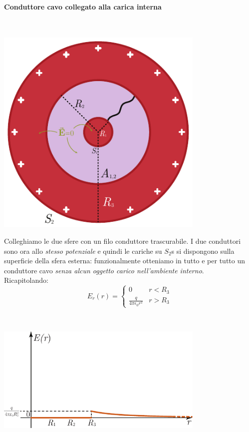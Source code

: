 \paragraph{Conduttore cavo collegato alla carica interna}~\\
\begin{minipage}{0.43\textwidth}
	\begin{center}
		\includegraphics[width=0.75\textwidth]{images/chp4sferacavaconsferacollegata.pdf}
	\end{center}
\end{minipage}\hspace{10pt}
\begin{minipage}{0.56\textwidth}
	Colleghiamo le due sfere con un filo conduttore trascurabile. I due conduttori sono ora allo \textit{stesso potenziale} e quindi le cariche su $S_2$s si dispongono sulla superficie della sfera esterna: funzionalmente otteniamo in tutto e per tutto un conduttore cavo \textit{senza alcun oggetto carico nell'ambiente interno}.\\
	Ricapitolando:
	\begin{equation*}
		E_{r}(r)=\begin{cases}
			0 & r<R_3\\
			\frac{q}{4\pi\epsilon_0 r^2} & r>R_3
		\end{cases}
	\end{equation*}
\end{minipage}\\
\begin{center}
	\includegraphics[width=0.75\textwidth]{images/chp4sferacava3graf1.pdf}
\end{center}
